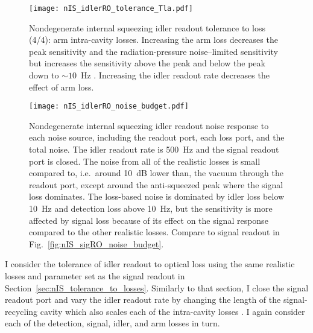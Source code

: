 \begin{figure}
    \centering
    \texttt{[image: nIS\_idlerRO\_tolerance\_Tla.pdf]} 
    \caption{ Nondegenerate internal squeezing idler readout tolerance to loss (4/4): arm intra-cavity losses. Increasing the arm loss decreases the peak sensitivity and the radiation-pressure noise--limited sensitivity but increases the sensitivity above the peak and below the peak down to $\sim10$~Hz . Increasing the idler readout rate decreases the effect of arm loss. }
    \label{fig:nIS_idlerRO_tolerance_Tla}
\end{figure}
\begin{figure}
    \centering
    \texttt{[image: nIS\_idlerRO\_noise\_budget.pdf]} 
    \caption{ Nondegenerate internal squeezing idler readout noise response to each noise source, including the readout port, each loss port, and the total noise. The idler readout rate is 500~Hz and the signal readout port is closed. The noise from all of the realistic losses is small compared to, i.e.\ around 10~dB lower than, the vacuum through the readout port, except around the anti-squeezed peak where the signal loss dominates. The loss-based noise is dominated by idler loss below 10~Hz and detection loss above 10~Hz, but the sensitivity is more affected by signal loss because of its effect on the signal response compared to the other realistic losses.  Compare to signal readout in Fig.~\ref{fig:nIS_sigRO_noise_budget}.}
    \label{fig:nIS_idlerRO_noise_budget}
\end{figure}


I consider the tolerance of idler readout to optical loss using the same realistic losses and parameter set as the signal readout in Section~\ref{sec:nIS_tolerance_to_losses}. Similarly to that section, I close the signal readout port and vary the idler readout rate by changing the length of the signal-recycling cavity which also scales each of the intra-cavity losses . I again consider each of the detection, signal, idler, and arm losses in turn.


